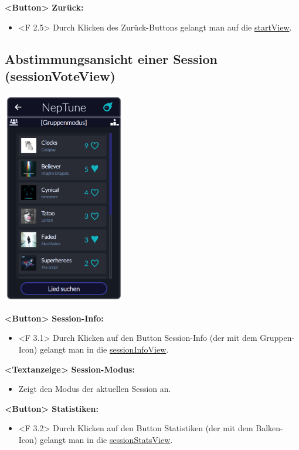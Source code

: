 \documentclass[oneside, ngerman]{sdqtechreport}
\begin{document}
\textbf{<Button> Zurück:}
\begin{itemize}
    \item <F 2.5> Durch Klicken des Zurück-Buttons gelangt man auf die \hyperlink{startView}{startView}.
\end{itemize}



\subsection{Abstimmungsansicht einer Session (sessionVoteView)}
\label{sec:Benutzeroberfläche:sessionVoteView}

\begin{center}
    \hypertarget{sessionVoteView}{}
    \includegraphics[width=0.4\textwidth]{LATEX/Pflichtenheft/GraphicDesigns/userVotePage.png}
\end{center}

\textbf{<Button> Session-Info:}
\begin{itemize}
    \item <F 3.1> Durch Klicken auf den Button Session-Info (der mit dem Gruppen-Icon) gelangt man in die \hyperlink{sessionInfoView}{sessionInfoView}.
\end{itemize}

\textbf{<Textanzeige> Session-Modus:}
\begin{itemize}
    \item Zeigt den Modus der aktuellen Session an.
\end{itemize}

\textbf{<Button> Statistiken:}
\begin{itemize}
    \item <F 3.2> Durch Klicken auf den Button Statistiken (der mit dem Balken-Icon) gelangt man in die \hyperlink{sessionStatsView}{sessionStatsView}.
\end{itemize}
\end{document}
